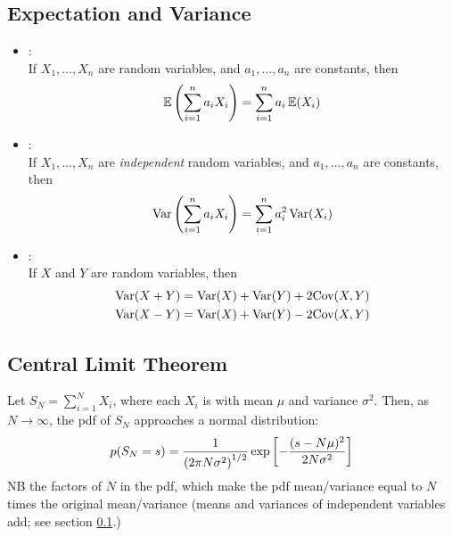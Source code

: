 \documentclass[11pt]{article}
\begin{document}
\subsection{Expectation and Variance}
\label{sec:ExpVar}
\begin{itemize}
  \item {}:\\
  If $X_1, \dots, X_n$ are random variables, and $a_1, \dots, a_n$ are constants, then
  \begin{equation}
    \mathbb{E} \left( \sum_{i=1}^n a_i X_i \right) = \sum_{i=1}^n a_i\, \mathbb{E} (X_i)
  \end{equation}

  \item {}:\\
  If $X_1, \dots, X_n$ are \emph{independent} random variables, and $a_1, \dots, a_n$
  are constants, then
  \begin{equation}
    \textrm{Var} \left( \sum_{i=1}^n a_i X_i \right) = \sum_{i=1}^n a_i^2\, \textrm{Var} (X_i)
  \end{equation}

  \item {}:\\
  If $X$ and $Y$ are random variables, then
  \begin{align}
    \textrm{Var} (X + Y) &= \textrm{Var}(X) + \textrm{Var}(Y) + 2 \textrm{Cov}(X, Y) \nonumber\\
    \textrm{Var} (X - Y) &= \textrm{Var}(X) + \textrm{Var}(Y) - 2 \textrm{Cov}(X, Y)
  \end{align}
  
\end{itemize}

\subsection{Central Limit Theorem}
Let $S_N = \sum_{i=1}^N X_i$, where each $X_i$ is  with mean $\mu$ and variance
$\sigma^2$. Then, as $N \to \infty$, the pdf of $S_N$ approaches a normal distribution:
\begin{equation}
  p(S_N = s) = \frac{1}{\left( 2 \pi N \sigma^2 \right)^{1/2}} \exp \left[ - \frac{(s - N
    \mu)^2}{2 N \sigma^2} \right] 
\end{equation}
NB the factors of $N$ in the pdf, which make the pdf mean/variance equal to $N$ times
the original mean/variance (\eie means and variances of independent variables add; see
section \ref{sec:ExpVar}.)
\end{document}
